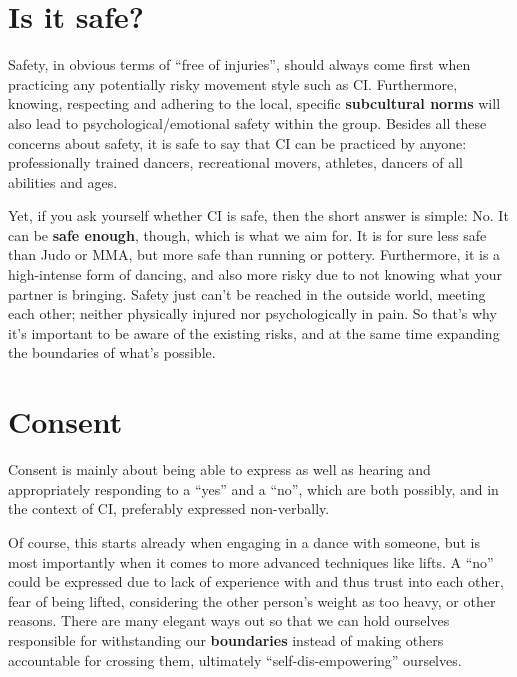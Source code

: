 \section{Is it safe?}\label{sec:is-it-safe?}

Safety, in obvious terms of ``free of injuries'', should always come first when practicing any potentially risky movement style such as CI\@.
Furthermore, knowing, respecting and adhering to the local, specific \textbf{subcultural norms} will also lead to psychological/emotional safety within the group.
Besides all these concerns about safety, it is safe to say that CI can be practiced by anyone: professionally trained dancers, recreational movers, athletes, dancers of all abilities and ages.

Yet, if you ask yourself whether CI is safe, then the short answer is simple: No.
It can be \textbf{safe enough}, though, which is what we aim for.
It is for sure less safe than Judo or MMA, but more safe than running or pottery.
Furthermore, it is a high-intense form of dancing, and also more risky due to not knowing what your partner is bringing.
Safety just can't be reached in the outside world, meeting each other; neither physically injured nor psychologically in pain.
So that's why it's important to be aware of the existing risks, and at the same time expanding the boundaries of what's possible.

\section{Consent}\label{sec:consent}

Consent is mainly about being able to express as well as hearing and appropriately responding to a ``yes'' and a ``no'', which are both possibly, and in the context of CI, preferably expressed non-verbally.

Of course, this starts already when engaging in a dance with someone, but is most importantly when it comes to more advanced techniques like lifts.
A ``no'' could be expressed due to lack of experience with and thus trust into each other, fear of being lifted, considering the other person's weight as too heavy, or other reasons.
There are many elegant ways out so that we can hold ourselves responsible for withstanding our \textbf{boundaries} instead of making others accountable for crossing them, ultimately ``self-dis-empowering'' ourselves.

